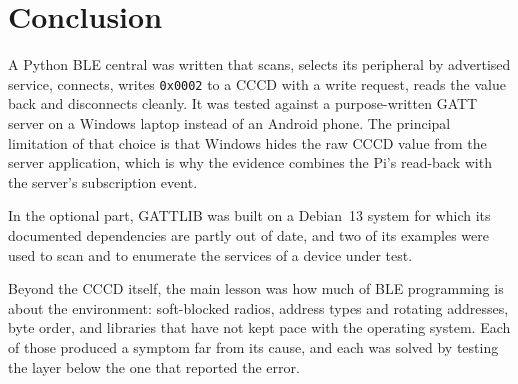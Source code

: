 \documentclass[11pt,a4paper]{article}
\begin{document}
\section{Conclusion}

A Python BLE central was written that scans, selects its peripheral by
advertised service, connects, writes \texttt{0x0002} to a CCCD with a write
request, reads the value back and disconnects cleanly. It was tested against a
purpose-written GATT server on a Windows laptop instead of an Android phone.
The principal limitation of that choice is that Windows hides the raw CCCD
value from the server application, which is why the evidence combines the
Pi's read-back with the server's subscription event.

In the optional part, GATTLIB was built on a Debian~13 system for which its
documented dependencies are partly out of date, and two of its examples were
used to scan and to enumerate the services of a device under test.

Beyond the CCCD itself, the main lesson was how much of BLE programming is
about the environment: soft-blocked radios, address types and rotating
addresses, byte order, and libraries that have not kept pace with the
operating system. Each of those produced a symptom far from its cause, and each
was solved by testing the layer below the one that reported the error.
\end{document}
